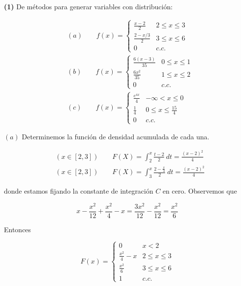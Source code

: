 \documentclass[a4paper, 12pt]{article}
\begin{document}
\begin{myframe}
  \textbf{(1)} De métodos para generar variables con distribución:

  \begin{align*}
    &(a) \qquad f(x) = \begin{cases}
      \frac{x-2}{2} & 2 \leq x \leq 3 \\ 
      \frac{2 - x /3}{2} & 3 \leq x \leq 6 \\ 
      0 & c.c.
    \end{cases} \\ 
    &(b) \qquad f(x) = \begin{cases}
      \frac{6(x-3)}{35} & 0 \leq x \leq 1 \\ 
      \frac{6x^2}{35} & 1 \leq x \leq 2 \\ 
      0 & c.c.
    \end{cases} \\ 
    &(c)\qquad f(x) = \begin{cases}
      \frac{e^{4x}}{4} & - \infty < x \leq 0 \\ 
      \frac{1}{4} & 0 \leq x \leq \frac{15}{4} \\ 
      0 & c.c.
    \end{cases}
  \end{align*}

\end{myframe}

$(a)$ Determinemos la función de densidad acumulada de cada una. 

\begin{align*}
  &(x \in [2, 3]) \qquad F(X) = \int_2^x \frac{t-2}{2} ~ dt = \frac{(x-2)^2}{4}\\
  &(x \in [2, 3]) \qquad F(X) = \int_3^x \frac{2-\frac{x}{3}}{2} ~ dt = \frac{(x-2)^2}{4}
\end{align*}



donde estamos fijando la constante de integración $C$ en cero. Observemos que 

\begin{equation*}
  x - \frac{x^2}{12} + \frac{x^2}{4} - x = \frac{3x^2}{12}- \frac{x^2}{12} =
  \frac{x^2}{6}
\end{equation*}

Entonces

\begin{equation*}
  F(x) = \begin{cases}
    0 & x < 2 \\
    \frac{x^2}{4} - x & 2 \leq x \leq 3 \\ 
    \frac{x^2}{6} & 3 \leq x \leq 6 \\ 
    1 & c.c.
  \end{cases}
\end{equation*}
\end{document}
